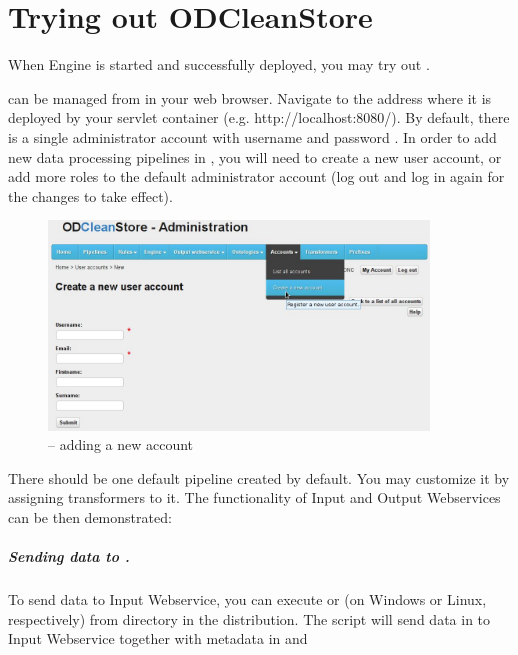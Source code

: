 \chapter{Trying out ODCleanStore}
When Engine is started and \FE successfully deployed, you may try out \odcs.

\odcs can be managed from \FE in your web browser. Navigate to the address where it is deployed by your servlet container (e.g. http://localhost:8080/). By default, there is a single administrator account with username  and password . In order to add new data processing pipelines in \FE, you will need to create a new user account, or add more roles to the default administrator account (log out and log in again for the changes to take effect).

\begin{figure}[htb]
    \centering
    \includegraphics[width=0.9\textwidth]{images/fe-new-account.png}
    \caption{\FE -- adding a new account}
\end{figure}

There should be one default pipeline created by default. You may customize it by assigning transformers to it.
The functionality of Input and Output Webservices can be then demonstrated:

\paragraph{Sending data to \odcs.}
    To send data to Input Webservice, you can execute  or  (on Windows or Linux, respectively) from 
   directory  in the distribution. The script will send data in 
   to Input Webservice together with metadata in 
   and 
   
